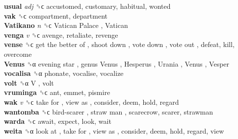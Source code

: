 \textbf{usual} \emph{adj}  ␝ϲ  accustomed, customary, habitual, wonted  \\
\textbf{vak} ␝ϲ  compartment, department  \\
\textbf{Vatikano} \emph{n}  ␝ϲ   Vatican Palace ,  Vatican   \\
\textbf{venga} \emph{v}  ␝ϲ  avenge, retaliate, revenge  \\
\textbf{vense} ␝ϲ   get the better of ,  shoot down ,  vote down ,  vote out , defeat, kill, overcome  \\
\textbf{Venus} ␝α   evening star ,  genus Venus ,  Hesperus ,  Urania ,  Venus ,  Vesper   \\
\textbf{vocalisa} ␝α  phonate, vocalise, vocalize  \\
\textbf{volt} ␝α   V , volt  \\
\textbf{vruminga} ␝ϲ  ant, emmet, pismire  \\
\textbf{wak} \emph{v}  ␝ϲ   take for ,  view as , consider, deem, hold, regard  \\
\textbf{wantomba} ␝ϲ   bird-scarer ,  straw man , scarecrow, scarer, strawman  \\
\textbf{warda} ␝ϲ  await, expect, look, wait  \\
\textbf{weita} ␝α   look at ,  take for ,  view as , consider, deem, hold, regard, view  \\
